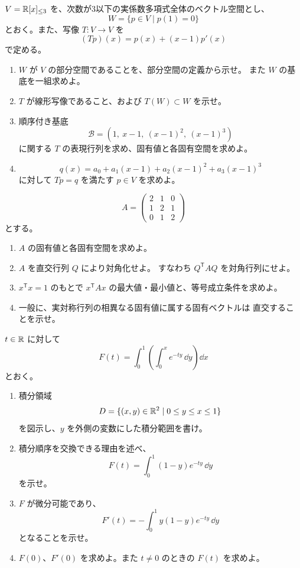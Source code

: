 
\(V=\mathbb R[x]_{\le3}\) を、次数が3以下の実係数多項式全体のベクトル空間とし、
\[
W=\{p\in V\mid p(1)=0\}
\]
とおく。また、写像 \(T:V\to V\) を
\[
(Tp)(x)=p(x)+(x-1)p'(x)
\]
で定める。

\begin{enumerate}
  \item \(W\) が \(V\) の部分空間であることを、部分空間の定義から示せ。
  また \(W\) の基底を一組求めよ。
  \item \(T\) が線形写像であること、および \(T(W)\subset W\) を示せ。
  \item 順序付き基底
  \[
  \mathcal B=(1,\ x-1,\ (x-1)^2,\ (x-1)^3)
  \]
  に関する \(T\) の表現行列を求め、固有値と各固有空間を求めよ。
  \item
  \[
  q(x)=a_0+a_1(x-1)+a_2(x-1)^2+a_3(x-1)^3
  \]
  に対して \(Tp=q\) を満たす \(p\in V\) を求めよ。
\end{enumerate}


\[
A=\begin{pmatrix}
2&1&0\\
1&2&1\\
0&1&2
\end{pmatrix}
\]
とする。

\begin{enumerate}
  \item \(A\) の固有値と各固有空間を求めよ。
  \item \(A\) を直交行列 \(Q\) により対角化せよ。
  すなわち \(Q^{\mathsf T}AQ\) を対角行列にせよ。
  \item \(x^{\mathsf T}x=1\) のもとで
  \(x^{\mathsf T}Ax\) の最大値・最小値と、等号成立条件を求めよ。
  \item 一般に、実対称行列の相異なる固有値に属する固有ベクトルは
  直交することを示せ。
\end{enumerate}


\(t\in\mathbb R\) に対して
\[
F(t)=\int_0^1\left(\int_0^x e^{-ty}\,\dd y\right)\dd x
\]
とおく。

\begin{enumerate}
  \item 積分領域
  \[
  D=\{(x,y)\in\mathbb R^2\mid0\le y\le x\le1\}
  \]
  を図示し、\(y\) を外側の変数にした積分範囲を書け。
  \item 積分順序を交換できる理由を述べ、
  \[
  F(t)=\int_0^1(1-y)e^{-ty}\,\dd y
  \]
  を示せ。
  \item \(F\) が微分可能であり、
  \[
  F'(t)=-\int_0^1y(1-y)e^{-ty}\,\dd y
  \]
  となることを示せ。
  \item \(F(0)\)、\(F'(0)\) を求めよ。また \(t\ne0\) のときの \(F(t)\) を求めよ。
\end{enumerate}

